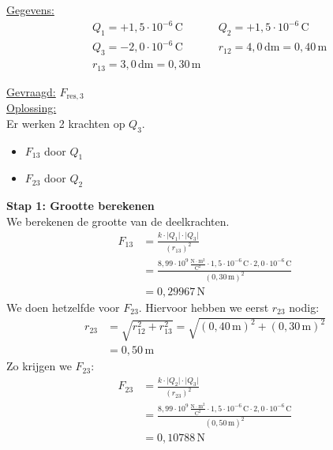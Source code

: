 \documentclass{ximera}
\begin{document}
\begin{exercise}
    \begin{solution}\nl
        \underline{Gegevens:}
        \begin{align*}
            & Q_{1} = +1{,}5 \cdot 10^{-6} \, \mathrm{C} & & Q_{2} = +1{,}5 \cdot 10^{-6} \, \mathrm{C} \\
            & Q_{3} = -2{,}0 \cdot 10^{-6} \, \mathrm{C} & & r_{12} =4{,}0\,\mathrm{dm} = 0{,}40 \, \mathrm{m}\\
            & r_{13} =3{,}0\,\mathrm{dm}= 0{,}30 \, \mathrm{m} & & 
        \end{align*}

        \underline{Gevraagd:} $ F_{\text{res},3}$\\ 

        \underline{Oplossing:}\\
        Er werken 2 krachten op $Q_{3}$. 
        \begin{itemize}
            \item $F_{13}$ door $Q_{1}$  
            \item $F_{23}$ door $Q_{2}$  
        \end{itemize}
        \textbf{Stap 1: Grootte berekenen}\\ 
        We berekenen de grootte van de deelkrachten.
        \begin{align*}
            F_{13}&=\frac{k\cdot\lvert Q_{1}\rvert\cdot\lvert Q_{3}\rvert}{(r_{13})^{2}} \\
            &=\frac{8{,}99 \cdot 10^9 \, \mathrm{\frac{N \cdot m^2}{C^2}} \cdot 1{,}5 \cdot 10^{-6} \, \mathrm{C} \cdot 2{,}0 \cdot 10^{-6} \, \mathrm{C}}{(0{,}30 \, \mathrm{m})^{2}} \\
            &= 0{,}29967 \, \mathrm{N}
        \end{align*}
        We doen hetzelfde voor $F_{23}$. Hiervoor hebben we eerst $r_{23}$ nodig:
        \begin{align*}
            r_{23} &= \sqrt{r_{12}^{2}+r_{13}^{2}}=\sqrt{(0{,}40 \, \mathrm{m})^{2}+(0{,}30 \, \mathrm{m})^{2}}\\
            &= 0{,}50 \, \mathrm{m}
        \end{align*}
        Zo krijgen we $F_{23}$:
        \begin{align*}
            F_{23}&=\frac{k\cdot\lvert Q_{2}\rvert\cdot\lvert Q_{3}\rvert}{(r_{23})^{2}} \\
            &=\frac{8{,}99 \cdot 10^9 \, \mathrm{\frac{N \cdot m^2}{C^2}} \cdot 1{,}5 \cdot 10^{-6} \, \mathrm{C} \cdot 2{,}0 \cdot 10^{-6} \, \mathrm{C}}{(0{,}50 \, \mathrm{m})^{2}} \\
            &= 0{,}10788 \, \mathrm{N} 
        \end{align*}


\end{solution}
\end{exercise}
\end{document}
